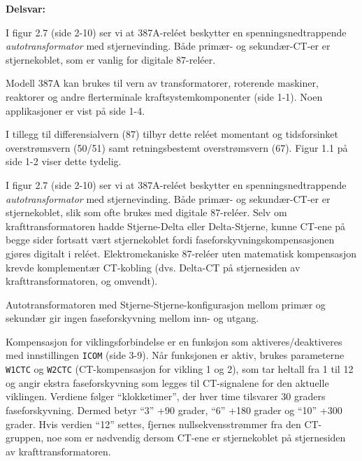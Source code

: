 





\noindent
{\bf Delsvar:}

\vskip 10pt

I figur 2.7 (side 2-10) ser vi at 387A-reléet beskytter en spenningsnedtrappende {\it autotransformator} med stjernevinding. Både primær- og sekundær-CT-er er stjernekoblet, som er vanlig for digitale 87-reléer.







Modell 387A kan brukes til vern av transformatorer, roterende maskiner, reaktorer og andre flerterminale kraftsystemkomponenter (side 1-1). Noen applikasjoner er vist på side 1-4.

\vskip 10pt

I tillegg til differensialvern (87) tilbyr dette reléet momentant og tidsforsinket overstrømsvern (50/51) samt retningsbestemt overstrømsvern (67). Figur 1.1 på side 1-2 viser dette tydelig.

\vskip 10pt

I figur 2.7 (side 2-10) ser vi at 387A-reléet beskytter en spenningsnedtrappende {\it autotransformator} med stjernevinding. Både primær- og sekundær-CT-er er stjernekoblet, slik som ofte brukes med digitale 87-reléer. Selv om krafttransformatoren hadde Stjerne-Delta eller Delta-Stjerne, kunne CT-ene på begge sider fortsatt vært stjernekoblet fordi faseforskyvningskompensasjonen gjøres digitalt i reléet. Elektromekaniske 87-reléer uten matematisk kompensasjon krevde komplementær CT-kobling (dvs. Delta-CT på stjernesiden av krafttransformatoren, og omvendt).

\vskip 10pt

Autotransformatoren med Stjerne-Stjerne-konfigurasjon mellom primær og sekundær gir ingen faseforskyvning mellom inn- og utgang.

\vskip 10pt

Kompensasjon for viklingsforbindelse er en funksjon som aktiveres/deaktiveres med innstillingen {\tt ICOM} (side 3-9). Når funksjonen er aktiv, brukes parameterne {\tt W1CTC} og {\tt W2CTC} (CT-kompensasjon for vikling 1 og 2), som tar heltall fra 1 til 12 og angir ekstra faseforskyvning som legges til CT-signalene for den aktuelle viklingen. Verdiene følger ``klokketimer'', der hver time tilsvarer 30 graders faseforskyvning. Dermed betyr ``3'' +90 grader, ``6'' +180 grader og ``10'' +300 grader. Hvis verdien ``12'' settes, fjernes nullsekvensstrømmer fra den CT-gruppen, noe som er nødvendig dersom CT-ene er stjernekoblet på stjernesiden av krafttransformatoren.


